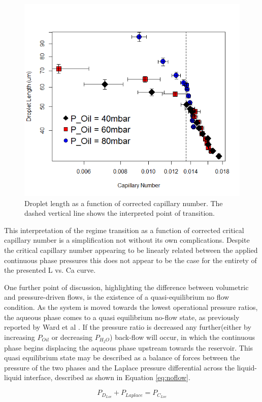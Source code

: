 \begin{figure}[H]
\centering 
\includegraphics[width=0.750\columnwidth]{ca_cor.PNG} 
\caption[Droplet Length as a function of Corrected Capillary Number]{Droplet length as a function of corrected capillary number. The dashed vertical line shows the interpreted point of transition.} 
\label{fig:ca_cor} 
\end{figure}

This interpretation of the regime transition as a function of corrected critical capillary number is a simplification not without its own complications. Despite the critical capillary number appearing to be linearly related between the applied continuous phase pressures this does not appear to be the case for the entirety of the presented L vs. Ca curve.

One further point of discussion, highlighting the difference between volumetric and pressure-driven flows, is the existence of a quasi-equilibrium no flow condition. As the system is moved towards the lowest operational pressure ratios, the aqueous phase comes to a quasi equilibrium no-flow state, as previously reported by Ward et al \cite{Ward2005}. If the pressure ratio is decreased any further(either by increasing $P_{Oil}$ or decreasing $P_{H_2O}$) back-flow will occur, in which the continuous phase begins displacing the aqueous phase upstream towards the reservoir. This quasi equilibrium state may be described as a balance of forces between the pressure of the two phases and the Laplace pressure differential across the liquid-liquid interface, described as shown in Equation \vref{eq:noflow}.

\begin{equation}
P_{D_{Loc}} + P_{Laplace} = P_{C_{Loc}} 
\label{eq:noflow}
\end{equation}

